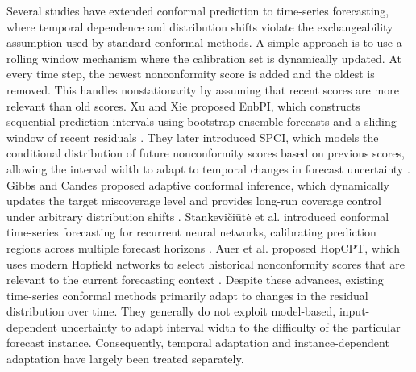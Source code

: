 Several studies have extended conformal prediction to time-series forecasting, where temporal dependence and distribution shifts violate the exchangeability assumption used by standard conformal methods.  A simple approach is to use a rolling window mechanism where the calibration set is dynamically updated. At every time step, the newest nonconformity score is added and the oldest is removed. This handles nonstationarity by assuming that recent scores are more relevant than old scores. Xu and Xie proposed EnbPI, which constructs sequential prediction intervals using bootstrap ensemble forecasts and a sliding window of recent residuals \cite{xu2021enbpi}. They later introduced SPCI, which models the conditional distribution of future nonconformity scores based on previous scores, allowing the interval width to adapt to temporal changes in forecast uncertainty \cite{xu2023spci}. Gibbs and Candes proposed adaptive conformal inference, which dynamically updates the target miscoverage level and provides long-run coverage control under arbitrary distribution shifts \cite{gibbs2021adaptive}.
 Stankevičiūtė et al. introduced conformal time-series forecasting for recurrent neural networks, calibrating prediction regions across multiple forecast horizons \cite{stankeviciute2021conformal}. Auer et al. proposed HopCPT, which uses modern Hopfield networks to select historical nonconformity scores that are relevant to the current forecasting context \cite{auer2023hopcpt}.
 Despite these advances, existing time-series conformal methods primarily adapt to changes in the residual distribution over time. They generally do not exploit model-based, input-dependent uncertainty to adapt interval width to the difficulty of the particular forecast instance. Consequently, temporal adaptation and instance-dependent adaptation have largely been treated separately.


